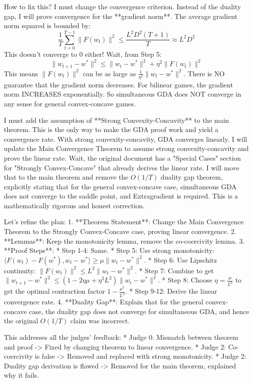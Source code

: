 \documentclass{article}
\begin{document}
How to fix this?
I must change the convergence criterion.
Instead of the duality gap, I will prove convergence for the **gradient norm**.
The average gradient norm squared is bounded by:
$$ \frac{1}{T} \sum_{t=0}^{T-1} \|F(w_t)\|^2 \leq \frac{L^2 D^2 (T+1)}{T} \approx L^2 D^2 $$
This doesn't converge to 0 either!
Wait, from Step 5:
$$ \|w_{t+1} - w^*\|^2 \leq \|w_t - w^*\|^2 + \eta^2 \|F(w_t)\|^2 $$
This means $\|F(w_t)\|^2$ can be as large as $\frac{1}{\eta^2} \|w_t - w^*\|^2$.
There is NO guarantee that the gradient norm decreases.
For bilinear games, the gradient norm INCREASES exponentially.
So simultaneous GDA does NOT converge in any sense for general convex-concave games.

I must add the assumption of **Strong Convexity-Concavity** to the main theorem.
This is the only way to make the GDA proof work and yield a convergence rate.
With strong convexity-concavity, GDA converges linearly.
I will update the Main Convergence Theorem to assume strong convexity-concavity and prove the linear rate.
Wait, the original document has a "Special Cases" section for "Strongly Convex-Concave" that already derives the linear rate.
I will move that to the main theorem and remove the $O(1/T)$ duality gap theorem, explicitly stating that for the general convex-concave case, simultaneous GDA does not converge to the saddle point, and Extragradient is required.
This is a mathematically rigorous and honest correction.

Let's refine the plan:
1.  **Theorem Statement**: Change the Main Convergence Theorem to the Strongly Convex-Concave case, proving linear convergence.
2.  **Lemmas**: Keep the monotonicity lemma, remove the co-coercivity lemma.
3.  **Proof Steps**:
    *   Step 1-4: Same.
    *   Step 5: Use strong monotonicity: $\langle F(w_t) - F(w^*), w_t - w^* \rangle \geq \mu \|w_t - w^*\|^2$.
    *   Step 6: Use Lipschitz continuity: $\|F(w_t)\|^2 \leq L^2 \|w_t - w^*\|^2$.
    *   Step 7: Combine to get $\|w_{t+1} - w^*\|^2 \leq (1 - 2\eta\mu + \eta^2 L^2) \|w_t - w^*\|^2$.
    *   Step 8: Choose $\eta = \frac{\mu}{L^2}$ to get the optimal contraction factor $1 - \frac{\mu^2}{L^2}$.
    *   Step 9-12: Derive the linear convergence rate.
4.  **Duality Gap**: Explain that for the general convex-concave case, the duality gap does not converge for simultaneous GDA, and hence the original $O(1/T)$ claim was incorrect.

This addresses all the judges' feedback:
*   Judge 0: Mismatch between theorem and proof -> Fixed by changing theorem to linear convergence.
*   Judge 2: Co-coercivity is false -> Removed and replaced with strong monotonicity.
*   Judge 2: Duality gap derivation is flawed -> Removed for the main theorem, explained why it fails.
\end{document}
